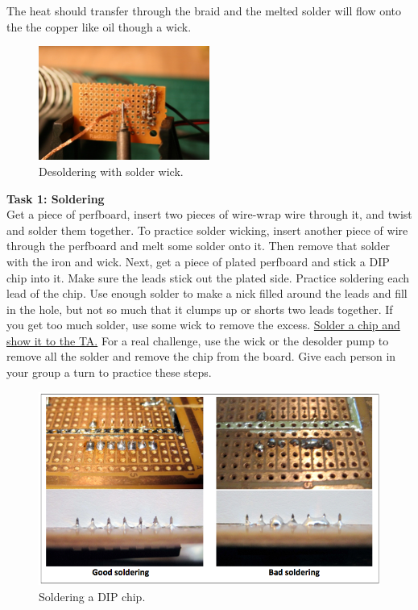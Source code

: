 \documentclass[12pt]{article}
\begin{document}
\begin{enumerate}[1.]
\begin{itemize}
The heat should transfer through the braid and the melted solder will flow onto the the copper like oil though a wick. 
\begin{figure}[!ht]
\begin{center}
\includegraphics[width=0.5\textwidth,trim=0 0 0 0,clip=false]{wick.png}
\caption*{Desoldering with solder wick.}
\end{center}
\end{figure}
\end{itemize}

{\bf Task 1: Soldering}\\
Get a piece of perfboard, insert two pieces of wire-wrap wire through it, and twist and solder them together. 
To practice solder wicking, insert another piece of wire through the perfboard and melt some solder onto it. 
Then remove that solder with the iron and wick.
Next, get a piece of plated perfboard and stick a DIP chip into it. 
Make sure the leads stick out the plated side. 
Practice soldering each lead of the chip. 
Use enough solder to make a nick filled around the leads and fill in the hole, but not so much that it clumps up or shorts two leads together. 
If you get too much solder, use some wick to remove the excess. 
\underline{Solder a chip and show it to the TA.}
For a real challenge, use the wick or the desolder pump to remove all the solder and remove the chip from the board.
Give each person in your group a turn to practice these steps.

\begin{figure}[!ht]
\begin{center}
\includegraphics[width=\textwidth,trim=0 0 0 0,clip=false]{dipchipsolder.png}
\caption*{Soldering a DIP chip.}
\end{center}
\end{figure}


\end{enumerate}
\end{document}
